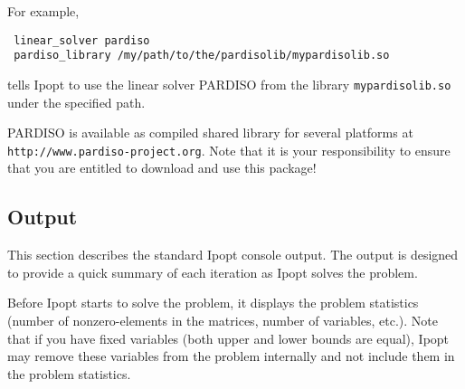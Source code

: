 For example,
\begin{verbatim}
 linear_solver pardiso
 pardiso_library /my/path/to/the/pardisolib/mypardisolib.so
\end{verbatim}
tells Ipopt to use the linear solver PARDISO from the library \verb=mypardisolib.so= under the specified path.

PARDISO is available as compiled shared library for several platforms at \texttt{http://www.pardiso-project.org}.
Note that it is your responsibility to ensure that you are entitled to download and use this package!

\subsection{Output}

This section describes the standard Ipopt console output.
The output is designed to provide a quick summary of each iteration as Ipopt solves the problem.

Before Ipopt starts to solve the problem, it displays the problem statistics (number of nonzero-elements in the matrices, number of variables, etc.).
Note that if you have fixed variables (both upper and lower bounds are equal), Ipopt may remove these variables from the problem internally and not include them in the problem statistics.

